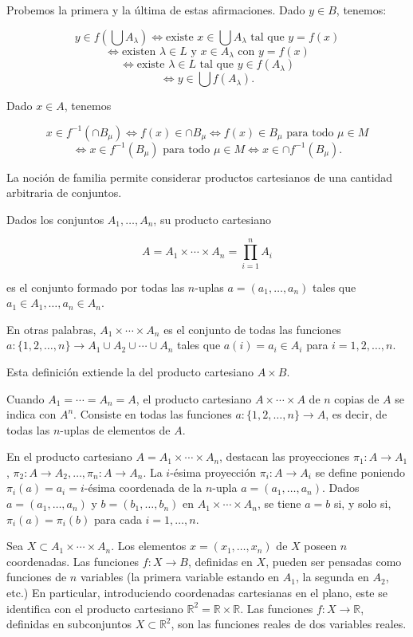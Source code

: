 Probemos la primera y la última de estas afirmaciones. Dado \(y \in B\), tenemos:

\[
y \in f\left(\bigcup A_\lambda\right) \iff \text{existe } x \in \bigcup A_\lambda \text{ tal que } y = f(x)
\]
\[
\iff \text{existen } \lambda \in L \text{ y } x \in A_\lambda \text{ con } y = f(x)
\]
\[
\iff \text{existe } \lambda \in L \text{ tal que } y \in f(A_\lambda)
\]
\[
\iff y \in \bigcup f(A_\lambda).
\]

Dado \( x \in A \), tenemos

\[
x \in f^{-1}(\cap B_\mu) \iff f(x) \in \cap B_\mu \iff f(x) \in B_\mu \text{ para todo } \mu \in M
\]
\[
\iff x \in f^{-1}(B_\mu) \text{ para todo } \mu \in M \iff x \in \cap f^{-1}(B_\mu).
\]

La noción de familia permite considerar productos cartesianos de una cantidad arbitraria de conjuntos.

Dados los conjuntos \( A_1, \ldots, A_n \), su producto cartesiano

\[
A = A_1 \times \cdots \times A_n = \prod_{i=1}^n A_i
\]

es el conjunto formado por todas las \( n \)-uplas \( a = (a_1, \ldots, a_n) \) tales que \( a_1 \in A_1, \ldots, a_n \in A_n \).

En otras palabras, \( A_1 \times \cdots \times A_n \) es el conjunto de todas las funciones \( a : \{1, 2, \ldots, n\} \to A_1 \cup A_2 \cup \cdots \cup A_n \) tales que \( a(i) = a_i \in A_i \) para \( i = 1, 2, \ldots, n \).

Esta definición extiende la del producto cartesiano \( A \times B \).

Cuando \( A_1 = \cdots = A_n = A \), el producto cartesiano \( A \times \cdots \times A \) de \( n \) copias de \( A \) se indica con \( A^n \). Consiste en todas las funciones \( a : \{1, 2, \ldots, n\} \to A \), es decir, de todas las \( n \)-uplas de elementos de \( A \).

En el producto cartesiano \( A = A_1 \times \cdots \times A_n \), destacan las proyecciones \( \pi_1 : A \to A_1 \), \( \pi_2 : A \to A_2, \ldots, \pi_n : A \to A_n \). La \( i \)-ésima proyección \( \pi_i : A \to A_i \) se define poniendo \( \pi_i(a) = a_i = i \)-ésima coordenada de la \( n \)-upla \( a = (a_1, \ldots, a_n) \). Dados \( a = (a_1, \ldots, a_n) \) y \( b = (b_1, \ldots, b_n) \) en \( A_1 \times \cdots \times A_n \), se tiene \( a = b \) si, y solo si, \( \pi_i(a) = \pi_i(b) \) para cada \( i = 1, \ldots, n \).

Sea \( X \subset A_1 \times \cdots \times A_n \). Los elementos \( x = (x_1, \ldots, x_n) \) de \( X \) poseen \( n \) coordenadas. Las funciones \( f : X \to B \), definidas en \( X \), pueden ser pensadas como funciones de \( n \) variables (la primera variable estando en \( A_1 \), la segunda en \( A_2 \), etc.) En particular, introduciendo coordenadas cartesianas en el plano, este se identifica con el producto cartesiano \( \mathbb{R}^2 = \mathbb{R} \times \mathbb{R} \). Las funciones \( f : X \to \mathbb{R} \), definidas en subconjuntos \( X \subset \mathbb{R}^2 \), son las funciones reales de dos variables reales.

